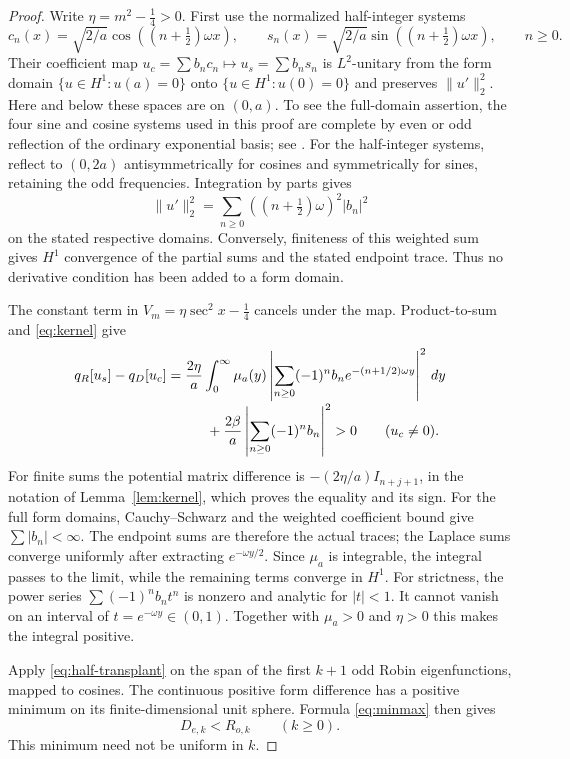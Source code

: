 \documentclass[11pt]{article}
\newcommand{\norm}[1]{\lVert#1\rVert}
\begin{document}
\begin{proof}
Write $\eta=m^2-\tfrac14>0$. First use the normalized half-integer
systems
\[
 c_n(x)=\sqrt{2/a}\cos((n+\tfrac12)\omega x),\qquad
 s_n(x)=\sqrt{2/a}\sin((n+\tfrac12)\omega x),\qquad n\geq0.
\]
Their coefficient map $u_c=\sum b_nc_n\mapsto u_s=\sum b_ns_n$ is
$L^2$-unitary from the form domain $\{u\in H^1:u(a)=0\}$ onto
$\{u\in H^1:u(0)=0\}$ and preserves $\norm{u'}_2^2$.
Here and below these spaces are on $(0,a)$. To see the full-domain
assertion, the four sine and cosine systems used in this proof are
complete by even or odd reflection of the ordinary exponential basis;
see \cite[Theorem 1.3 and Example (1.23)]{T}. For the half-integer
systems, reflect to $(0,2a)$ antisymmetrically for cosines and
symmetrically for sines, retaining the odd frequencies. Integration by
parts gives
\[
 \norm{u'}_2^2=\sum_{n\geq0}((n+\tfrac12)\omega)^2|b_n|^2
\]
on the stated respective domains. Conversely, finiteness of this
weighted sum gives $H^1$ convergence of the partial sums and the stated
endpoint trace. Thus no derivative condition has been added to a form
domain.

The constant term in $V_m=\eta\sec^2x-\tfrac14$ cancels under the map.
Product-to-sum and \eqref{eq:kernel} give
\begin{align}\label{eq:half-transplant}
 q_R[u_s]-q_D[u_c]
 &=\frac{2\eta}{a}\int_0^\infty\mu_a(y)
       \left|\sum_{n\geq0}(-1)^n b_ne^{-(n+1/2)\omega y}\right|^2\,dy
 \notag\\[-2pt]
 &\hspace{1cm}+\frac{2\beta}{a}
       \left|\sum_{n\geq0}(-1)^n b_n\right|^2>0\qquad(u_c\ne0).
\end{align}
For finite sums the potential matrix difference is
$-(2\eta/a)I_{n+j+1}$, in the notation of Lemma~\ref{lem:kernel},
which proves the equality and its sign. For the full form domains,
Cauchy--Schwarz and the weighted coefficient bound give
$\sum|b_n|<\infty$. The endpoint sums are therefore the actual traces;
the Laplace sums converge uniformly after extracting
$e^{-\omega y/2}$. Since $\mu_a$ is integrable, the integral passes to
the limit, while the remaining terms converge in $H^1$.
For strictness, the power series
$\sum(-1)^nb_nt^n$ is nonzero and analytic for $|t|<1$.
It cannot vanish on an interval of $t=e^{-\omega y}\in(0,1)$.
Together with $\mu_a>0$ and $\eta>0$ this makes the integral positive.

Apply \eqref{eq:half-transplant} on the span of the first $k+1$ odd
Robin eigenfunctions, mapped to cosines. The continuous positive form
difference has a positive minimum on its finite-dimensional unit sphere.
Formula \eqref{eq:minmax} then gives
\begin{equation}\label{eq:first-cross}
 D_{e,k}<R_{o,k}\qquad(k\geq0).
\end{equation}
This minimum need not be uniform in $k$.


\end{proof}
\end{document}

